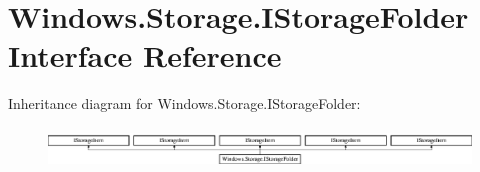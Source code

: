 \hypertarget{interface_windows_1_1_storage_1_1_i_storage_folder}{}\section{Windows.\+Storage.\+I\+Storage\+Folder Interface Reference}
\label{interface_windows_1_1_storage_1_1_i_storage_folder}
Inheritance diagram for Windows.\+Storage.\+I\+Storage\+Folder\+:\begin{figure}[H]
\begin{center}
\leavevmode
\includegraphics[height=1.087379cm]{interface_windows_1_1_storage_1_1_i_storage_folder}
\end{center}
\end{figure}
